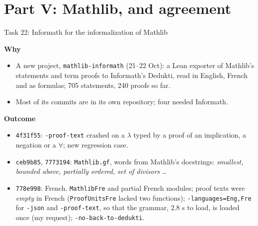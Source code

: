 \documentclass[10pt,aspectratio=169]{beamer}
\newcommand{\commit}[1]{\texttt{\footnotesize #1}}
\newcommand{\why}{\par\textcolor{gfblue}{\textbf{Why}}\par}
\newcommand{\what}{\par\textcolor{gfblue}{\textbf{Outcome}}\par}
\begin{document}
\section{Part V: Mathlib, and agreement}

\begin{frame}{Task 22: Informath for the informalization of Mathlib}
  \why
  \begin{itemize}\small
    \item A new project, \texttt{mathlib-informath} (21--22 Oct): a Lean exporter of
          Mathlib's statements and term proofs to Informath's Dedukti, read in
          English, French and as formulas; 705 statements, 240 proofs so far.
    \item Most of its commits are in its own repository; four needed Informath.
  \end{itemize}
  \what
  \begin{itemize}\small
    \item \commit{4f31f55}: \texttt{-proof-text} crashed on a $\lambda$ typed by a proof
          of an implication, a negation or a $\forall$; new regression case.
    \item \commit{ceb9b85}, \commit{7773194}: \texttt{Mathlib.gf}, words from Mathlib's
          docstrings: \emph{smallest, bounded above, partially ordered, set of
          divisors} \dots
    \item \commit{778e998}: French. \texttt{MathlibFre} and partial French modules;
          proof texts were \emph{empty} in French (\texttt{ProofUnitsFre} lacked two
          functions); \texttt{-languages=Eng,Fre} for \texttt{-json} and
          \texttt{-proof-text}, so that the grammar, 2.8 s to load, is loaded once
          (my request); \texttt{-no-back-to-dedukti}.
  \end{itemize}
\end{frame}
\end{document}

